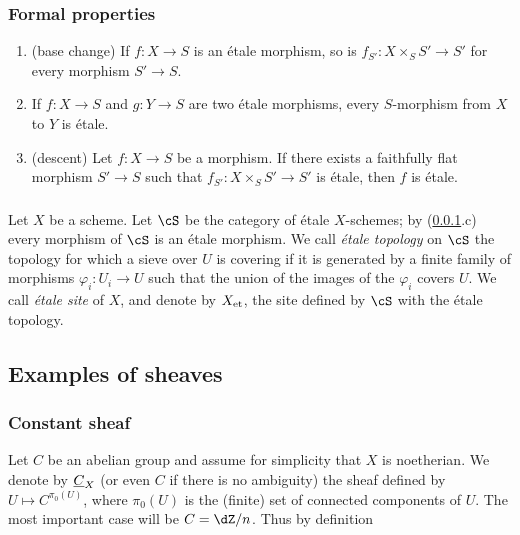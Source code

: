 \subsubsection{Formal properties}\label{I:2-1-3}
\begin{enumerate}[\indent a)]
  \item (base change) If $f:X\to S$ is an \'etale morphism, so is 
    $f_{S'}:X\times_S S'\to S'$ for every morphism $S'\to S$. 
  \item If $f:X\to S$ and $g:Y\to S$ are two \'etale morphisms, every 
    $S$-morphism from $X$ to $Y$ is \'etale.
  \item (descent) Let $f:X\to S$ be a morphism. If there exists a 
    faithfully flat morphism $S'\to S$ such that $f_{S'}:X\times_S S'\to S'$ is 
    \'etale, then $f$ is \'etale.
\end{enumerate}





\subsubsection{}\label{I:2-1-4}

Let $X$ be a scheme. Let $\cS$ be the category of \'etale $X$-schemes; 
by (\ref{I:2-1-3}.c) every morphism of $\cS$ is an \'etale morphism. 
We call \emph{\'etale topology} on $\cS$ the topology for which a 
sieve over $U$ is covering if it is generated by a finite family of 
morphisms $\varphi_i:U_i\to U$ such that the union of the images of the 
$\varphi_i$ covers $U$. We call \emph{\'etale site} of $X$, and denote by 
${X}_{\textnormal{et}}$, the site defined by $\cS$ with the \'etale topology. 










\subsection{Examples of sheaves}\label{I:2-2}





\subsubsection{Constant sheaf}\label{I:2-2-1}

Let $C$ be an abelian group and assume for simplicity that $X$ is noetherian. We 
denote by $\underline{C}_X$ (or even $C$ if there is no ambiguity) the sheaf 
defined by $U\mapsto C^{\pi_0(U)}$, where $\pi_0(U)$ is the (finite) set of 
connected components of $U$. The most important case will be $C=\dZ/n$. Thus by definition 
 
